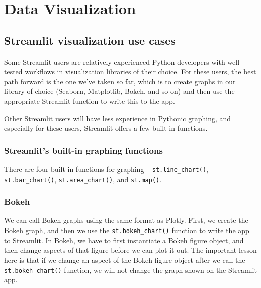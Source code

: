 \chapter{Data Visualization\label{ch03}}
\section{}
\section{Streamlit visualization use cases}
Some Streamlit users are relatively experienced Python developers with well-tested workflows in visualization libraries of their choice. For these users, the best path forward is the one we've taken so far, which is to create graphs in our library of choice (Seaborn, Matplotlib, Bokeh, and so on) and then use the appropriate Streamlit function to write this to the app.

Other Streamlit users will have less experience in Pythonic graphing, and especially for these users, Streamlit offers a few built-in functions.

\subsection{Streamlit's built-in graphing functions}
There are four built-in functions for graphing – \verb|st.line_chart()|, \verb|st.bar_chart()|, \verb|st.area_chart()|, and \verb|st.map()|.
\subsection{Bokeh}
We can call Bokeh graphs using the same format as Plotly. First, we create the Bokeh graph, and then we use the \verb|st.bokeh_chart()| function to write the app to Streamlit. In Bokeh, we have to first instantiate a Bokeh figure object, and then change aspects of that figure before we can plot it out. The important lesson here is that if we change an aspect of the Bokeh figure object after we call the \verb|st.bokeh_chart()| function, we will not change the graph shown on the Streamlit app.